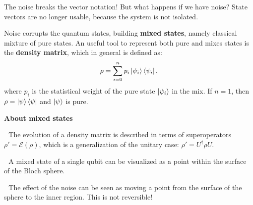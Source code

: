 \documentclass[aspectratio=169, 8pt, xcolor={svgnames}, hyperref={linkcolor=black}]{beamer}
\begin{document}
\begin{frame}{The noise breaks the vector notation!}
\textcolor{carnelian}{But what happens if we have noise?} \pause State vectors 
are no longer usable, because the system is not isolated. \pause

Noise corrupts the quantum states, building \textbf{mixed states}, namely classical 
mixture of pure states. \pause An useful tool to represent both pure and mixes states is the \textbf{density matrix}, 
which in general is defined as:
$$ \rho = \sum_{i=0}^n p_i \ket{\psi_i}\bra{\psi_i}, $$
where $p_i$ is the statistical weight of the pure state $\ket{\psi_i}$ in the mix. 
If $n=1$, then $\rho=\ket{\psi}\bra{\psi}$ and $\ket{\psi}$ is pure. \pause

\begin{multicols}{2}
\textbf{About mixed states}

{\footnotesize\faCircle\,\,} The evolution of a density matrix is described in terms 
of superoperators $\rho' = \mathcal{E} (\rho)$, which is a generalization of the 
unitary case: $ \rho' = U^{\dagger} \rho U. $ 

{\footnotesize\faCircle\,\,} A mixed state of a single qubit can be visualized as a point within the surface
of the Bloch sphere. 

{\footnotesize\faCircle\,\,} The effect of the noise can be seen as moving a point 
from the surface of the sphere to the inner region. This is not reversible! 
\begin{center}
\end{center}
\end{multicols}

\end{frame}
\end{document}
